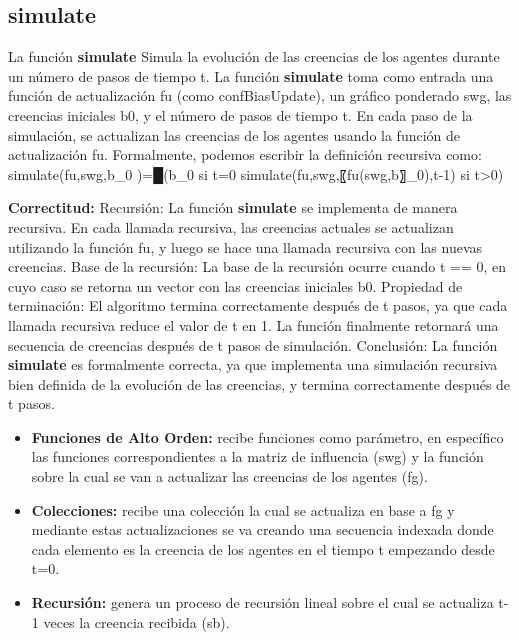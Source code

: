 \documentclass{article}
\begin{document}
    \subsection{simulate}
    La función \textbf{simulate} Simula la evolución de las creencias de los agentes durante un número de pasos de tiempo t.
    La función \textbf{simulate} toma como entrada una función de actualización fu (como confBiasUpdate), un gráfico ponderado swg, las creencias iniciales b0, y el número de pasos de tiempo t.
    En cada paso de la simulación, se actualizan las creencias de los agentes usando la función de actualización fu.
    Formalmente, podemos escribir la definición recursiva como:
    simulate(fu,swg,b_0 )={█(b_0                               si t=0 }
                          {simulate(fu,swg,〖fu(swg,b〗_0),t-1) si t>0)}

    \textbf{Correctitud:}
    Recursión: La función \textbf{simulate} se implementa de manera recursiva. En cada llamada recursiva, las creencias actuales se actualizan utilizando la función fu, y luego se hace una llamada recursiva con las nuevas creencias.
    Base de la recursión: La base de la recursión ocurre cuando t == 0, en cuyo caso se retorna un vector con las creencias iniciales b0.
    Propiedad de terminación: El algoritmo termina correctamente después de t pasos, ya que cada llamada recursiva reduce el valor de t en 1. La función finalmente retornará una secuencia de creencias después de t pasos de simulación.
    Conclusión: La función \textbf{simulate} es formalmente correcta, ya que implementa una simulación recursiva bien definida de la evolución de las creencias, y termina correctamente después de t pasos.

    \begin{itemize}
      \item \textbf{Funciones de Alto Orden:} recibe funciones como parámetro, en específico las funciones correspondientes a la matriz de influencia (swg) y la función sobre la cual se van a actualizar las creencias de los agentes (fg).
      \item \textbf{Colecciones:} recibe una colección la cual se actualiza en base a fg y mediante estas actualizaciones se va creando una secuencia indexada donde cada elemento es la creencia de los agentes en el tiempo t empezando desde t=0.
      \item \textbf{Recursión:} genera un proceso de recursión lineal sobre el cual se actualiza t-1 veces la creencia recibida (sb).
    \end{itemize}
\end{document}
